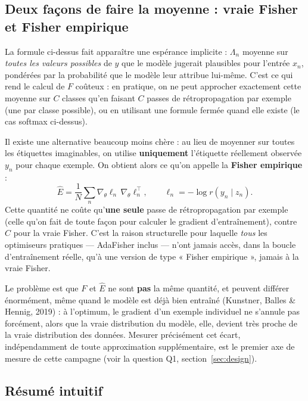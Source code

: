 \documentclass[11pt,a4paper]{article}
\begin{document}
\subsection{Deux façons de faire la moyenne : vraie Fisher et Fisher empirique}

La formule ci-dessus fait apparaître une espérance implicite : $\Lambda_n$ moyenne sur
\emph{toutes les valeurs possibles} de $y$ que le modèle jugerait plausibles pour l'entrée $x_n$,
pondérées par la probabilité que le modèle leur attribue lui-même. C'est ce qui rend le calcul de
$F$ coûteux : en pratique, on ne peut approcher exactement cette moyenne sur $C$ classes qu'en faisant
$C$ passes de rétropropagation par exemple (une par classe possible), ou en utilisant une formule
fermée quand elle existe (le cas softmax ci-dessus).

Il existe une alternative beaucoup moins chère : au lieu de moyenner sur toutes les étiquettes
imaginables, on utilise \textbf{uniquement} l'étiquette réellement observée $y_n$ pour chaque
exemple. On obtient alors ce qu'on appelle la \textbf{Fisher empirique} :
\[
\hat E = \frac1N\sum_n \nabla_\theta \ell_n \, \nabla_\theta \ell_n^\top,
\qquad \ell_n = -\log r(y_n\mid z_n).
\]
Cette quantité ne coûte qu'\textbf{une seule} passe de rétropropagation par exemple (celle qu'on
fait de toute façon pour calculer le gradient d'entraînement), contre $C$ pour la vraie Fisher. C'est
la raison structurelle pour laquelle \emph{tous} les optimiseurs pratiques — AdaFisher inclus — n'ont
jamais accès, dans la boucle d'entraînement réelle, qu'à une version de type « Fisher empirique »,
jamais à la vraie Fisher.

Le problème est que $F$ et $\hat E$ ne sont \textbf{pas} la même quantité, et peuvent différer
énormément, même quand le modèle est déjà bien entraîné (Kunstner, Balles \& Hennig, 2019) : à
l'optimum, le gradient d'un exemple individuel ne s'annule pas forcément, alors que la vraie
distribution du modèle, elle, devient très proche de la vraie distribution des données. Mesurer
précisément cet écart, indépendamment de toute approximation supplémentaire, est le premier axe de
mesure de cette campagne (voir la question Q1, section~\ref{sec:design}).

\subsection{Résumé intuitif}
\end{document}
